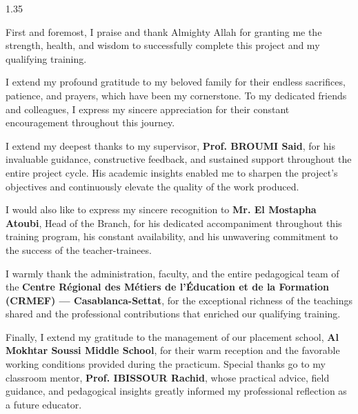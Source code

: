 \documentclass[12pt,a4paper]{report}
\begin{document}
{\large
\begin{spacing}{1.35}
\justifying\color{grisTexte}

First and foremost, I praise and thank Almighty Allah for granting me the strength, health, and wisdom to successfully complete this project and my qualifying training.

I extend my profound gratitude to my beloved family for their endless sacrifices, patience, and prayers, which have been my cornerstone. To my dedicated friends and colleagues, I express my sincere appreciation for their constant encouragement throughout this journey.

I extend my deepest thanks to my supervisor, \textbf{Prof. BROUMI Said}, for his invaluable guidance, constructive feedback, and sustained support throughout the entire project cycle. His academic insights enabled me to sharpen the project’s objectives and continuously elevate the quality of the work produced.

I would also like to express my sincere recognition to \textbf{Mr. El Mostapha Atoubi}, Head of the Branch, for his dedicated accompaniment throughout this training program, his constant availability, and his unwavering commitment to the success of the teacher-trainees.

I warmly thank the administration, faculty, and the entire pedagogical team of the \textbf{Centre Régional des Métiers de l'Éducation et de la Formation (CRMEF) — Casablanca-Settat}, for the exceptional richness of the teachings shared and the professional contributions that enriched our qualifying training.

Finally, I extend my gratitude to the management of our placement school, \textbf{Al Mokhtar Soussi Middle School}, for their warm reception and the favorable working conditions provided during the practicum. Special thanks go to my classroom mentor, \textbf{Prof. IBISSOUR Rachid}, whose practical advice, field guidance, and pedagogical insights greatly informed my professional reflection as a future educator.

\end{spacing}
}

\newpage

\tableofcontents
\newpage

\setcounter{page}{1}
\end{document}
